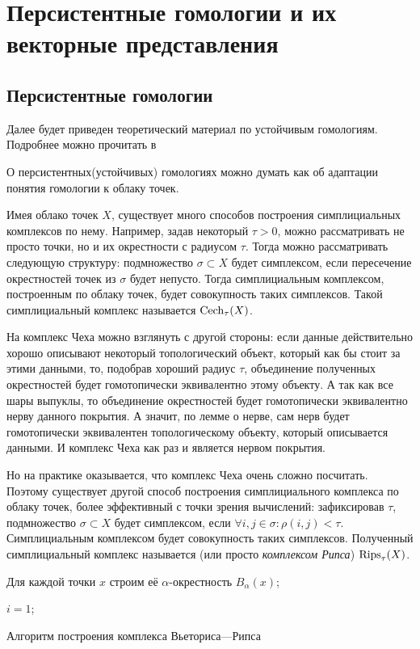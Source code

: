 \section{Персистентные гомологии и их векторные представления}
\subsection{Персистентные гомологии}
Далее будет приведен теоретический материал по устойчивым гомологиям. Подробнее можно прочитать в \cite{Edelsbrunner, base, alsobase}

О персистентных(устойчивых) гомологиях можно думать как об адаптации понятия гомологии к облаку точек. 

Имея облако точек $X$, существует много способов построения симплициальных комплексов по нему. Например, задав некоторый $\tau > 0$, можно рассматривать не просто точки, но и их окрестности с радиусом $\tau$. Тогда можно рассматривать следующую структуру: подмножество $\sigma \subset X$ будет симплексом, если пересечение окрестностей точек из $\sigma$ будет непусто. Тогда симплициальным комплексом, построенным по облаку точек, будет совокупность таких симплексов. Такой симплициальный комплекс называется  $\mathrm{Cech}_\tau(X)$. 

На комплекс Чеха можно взглянуть с другой стороны: если данные действительно хорошо описывают некоторый топологический объект, который как бы стоит за этими данными, то, подобрав хороший радиус $\tau$, объединение полученных окрестностей будет гомотопически эквивалентно этому объекту. А так как все шары выпуклы, то объединение окрестностей будет гомотопически эквивалентно нерву данного покрытия. А значит, по лемме о нерве, сам нерв будет гомотопически эквивалентен топологическому объекту, который описывается данными. И комплекс Чеха как раз и является нервом покрытия. 

Но на практике оказывается, что комплекс Чеха очень сложно посчитать. Поэтому существует другой способ построения симплициального комплекса по облаку точек, более эффективный с точки зрения вычислений: зафиксировав $\tau$, подмножество $\sigma \subset X$ будет симплексом, если $\forall i,j \in \sigma: \rho(i,j) < \tau$. Симплициальным комплексом будет совокупность таких симплексов. Полученный симплициальный комплекс называется (или просто {\it комплексом Рипса}) $\mathrm{Rips}_\tau(X)$.

\medskip
\begin{algorithm}[H]
	\small
	\SetAlgoLined
	Для каждой точки $x$ строим её $\alpha$-окрестность $B_\alpha(x)$;
	
	$i = 1$;
	
	\caption{Алгоритм построения комплекса Вьеториса—Рипса}
\end{algorithm}
\medskip

